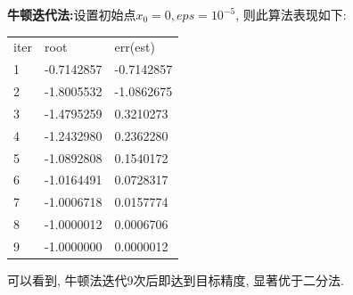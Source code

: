 \documentclass{beamer}
\begin{document}
\begin{frame}
    \par \textbf{牛顿迭代法:}设置初始点$x_0 = 0, eps = 10^{-5}$, 则此算法表现如下:
\newpage
\begin{table}[h]
    \begin{tabular}{lll}
    iter & root       & err(est)    \\
    1    & -0.7142857 & -0.7142857 \\
    2    & -1.8005532 & -1.0862675 \\
    3    & -1.4795259 & 0.3210273  \\
    4    & -1.2432980 & 0.2362280  \\
    5    & -1.0892808 & 0.1540172  \\
    6    & -1.0164491 & 0.0728317  \\
    7    & -1.0006718 & 0.0157774  \\
    8    & -1.0000012 & 0.0006706  \\
    9    & -1.0000000 & 0.0000012 
    \end{tabular}
    \end{table}
    \par 可以看到, 牛顿法迭代9次后即达到目标精度, 显著优于二分法.
\end{frame}
\end{document}
